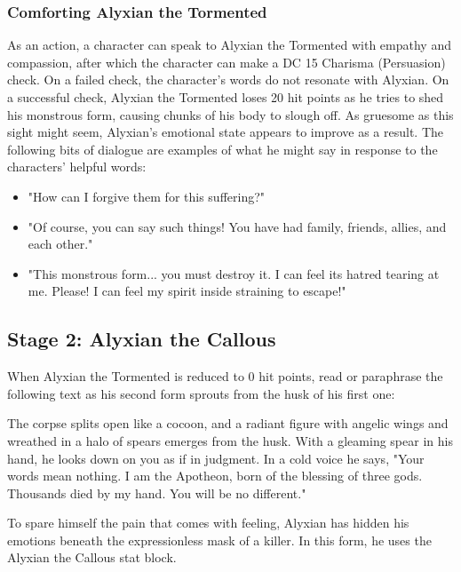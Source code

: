 \documentclass[10pt,a4paper,twoside,twocolumn,openany,nodeprecatedcode]{dndbook}
\begin{document}
\subsubsection{Comforting Alyxian the Tormented}
As an action, a character can speak to Alyxian the Tormented with empathy and compassion, after which the character can make a DC 15 Charisma (Persuasion) check. On a failed check, the character's words do not resonate with Alyxian. On a successful check, Alyxian the Tormented loses 20 hit points as he tries to shed his monstrous form, causing chunks of his body to slough off. As gruesome as this sight might seem, Alyxian's emotional state appears to improve as a result. The following bits of dialogue are examples of what he might say in response to the characters' helpful words:


\begin{itemize}
\item "How can I forgive them for this suffering?"
\item "Of course, you can say such things! You have had family, friends, allies, and each other."
\item "This monstrous form... you must destroy it. I can feel its hatred tearing at me. Please! I can feel my spirit inside straining to escape!"
\end{itemize}


\subsection{Stage 2: Alyxian the Callous}
When Alyxian the Tormented is reduced to 0 hit points, read or paraphrase the following text as his second form sprouts from the husk of his first one:

\begin{DndReadAloud}{}
The corpse splits open like a cocoon, and a radiant figure with angelic wings and wreathed in a halo of spears emerges from the husk. With a gleaming spear in his hand, he looks down on you as if in judgment. In a cold voice he says, "Your words mean nothing. I am the Apotheon, born of the blessing of three gods. Thousands died by my hand. You will be no different."

\end{DndReadAloud}

To spare himself the pain that comes with feeling, Alyxian has hidden his emotions beneath the expressionless mask of a killer. In this form, he uses the Alyxian the Callous stat block.
\end{document}
